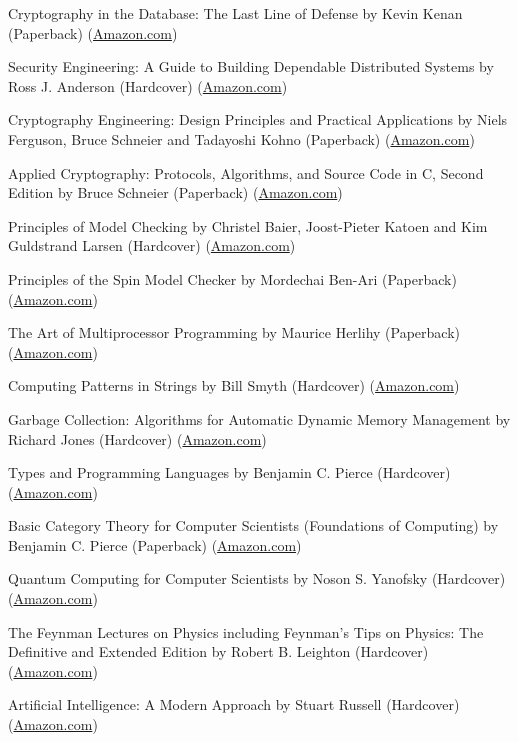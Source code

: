 \documentclass[10pt]{article}
\newenvironment{innerlist}[1][\enskip\textbullet]%
      {\begin{flushleft}\begin{compactitem}[#1]}{\end{compactitem}\end{flushleft}}
\newcommand{\bookitem}[5]{\item #1 \linebreak by #2 (#3) (\href{#4}{#5})}
\newcommand{\amazon}[4]{\bookitem{#1}{#2}{#3}{http://www.amazon.com/#4}{Amazon.com}}
\begin{document}
\begin{innerlist}
          \amazon{Cryptography in the Database: The Last Line of Defense}
                 {Kevin Kenan}{Paperback}
                 {Cryptography-Database-Last-Line-Defense/dp/0321320735}
          \amazon{Security Engineering: A Guide to Building Dependable Distributed Systems}
                 {Ross J. Anderson}{Hardcover}
                 {Security-Engineering-Building-Dependable-Distributed/dp/0470068523}
          \amazon{Cryptography Engineering: Design Principles and Practical Applications}
                 {Niels Ferguson, Bruce Schneier and Tadayoshi Kohno}{Paperback}
                 {Cryptography-Engineering-Principles-Practical-Applications/dp/0470474246}
          \amazon{Applied Cryptography:
            Protocols, Algorithms, and Source Code in C, Second Edition}
                 {Bruce Schneier}{Paperback}
                 {Applied-Cryptography-Protocols-Algorithms-Source/dp/0471117099}

          \amazon{Principles of Model Checking}
          {Christel Baier, Joost-Pieter Katoen and Kim Guldstrand Larsen}{Hardcover}
          {Principles-Model-Checking-Christel-Baier/dp/026202649}
          \amazon{Principles of the Spin Model Checker}
                 {Mordechai Ben-Ari}{Paperback}
                 {Principles-Model-Checker-Mordechai-Ben-Ari/dp/1846287693}

          \amazon{The Art of Multiprocessor Programming}
                 {Maurice Herlihy}{Paperback}
                 {Art-Multiprocessor-Programming-Maurice-Herlihy/dp/0123705916}
          \amazon{Computing Patterns in Strings}
                 {Bill Smyth}{Hardcover}
                 {Computing-Patterns-Strings-William-Smyth/dp/0201398397}
          \amazon{Garbage Collection:
            Algorithms for Automatic Dynamic Memory Management}
                 {Richard Jones}{Hardcover}
                 {Garbage-Collection-Algorithms-Automatic-Management/dp/0471941484}
          \amazon{Types and Programming Languages}
                 {Benjamin C. Pierce}{Hardcover}
                 {Types-Programming-Languages-Benjamin-Pierce/dp/0262162091}
          \amazon{Basic Category Theory for Computer Scientists
            (Foundations of Computing)}
                 {Benjamin C. Pierce}{Paperback}
                 {Category-Computer-Scientists-Foundations-Computing/dp/0262660717}
          \amazon{Quantum Computing for Computer Scientists}
                 {Noson S. Yanofsky}{Hardcover}
                 {Quantum-Computing-Computer-Scientists-Yanofsky/dp/0521879965}
          \amazon{The Feynman Lectures on Physics including Feynman's Tips on Physics:
            The Definitive and Extended Edition}
                 {Robert B. Leighton}{Hardcover}
                 {Feynman-Lectures-Physics-including-Feynmans/dp/0805390456}
          \amazon{Artificial Intelligence: A Modern Approach}
                 {Stuart Russell}{Hardcover}
                 {Artificial-Intelligence-Modern-Approach-3rd/dp/0136042597}


\end{innerlist}
\end{document}
